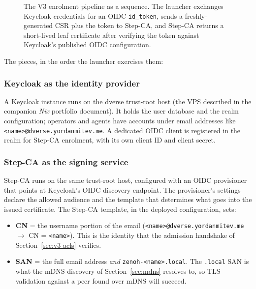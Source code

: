 \documentclass[11pt,a4paper]{article}
\begin{document}
\begin{figure}[H]
\caption{The V3 enrolment pipeline as a sequence. The launcher
exchanges Keycloak credentials for an OIDC \texttt{id\_token},
sends a freshly-generated CSR plus the token to Step-CA, and
Step-CA returns a short-lived leaf certificate after verifying the
token against Keycloak's published OIDC configuration.}
\label{fig:oidc-flow}
\end{figure}

The pieces, in the order the launcher exercises them:

\subsubsection{Keycloak as the identity provider}
A Keycloak instance runs on the dverse trust-root host (the VPS
described in the companion \emph{Nix} portfolio document). It holds
the user database and the realm configuration; operators and agents
have accounts under email addresses like
\texttt{<name>@dverse.yordanmitev.me}. A dedicated OIDC client is
registered in the realm for Step-CA enrolment, with its own client
ID and client secret.

\subsubsection{Step-CA as the signing service}
Step-CA runs on the same trust-root host, configured with an OIDC
provisioner that points at Keycloak's OIDC discovery endpoint. The
provisioner's settings declare the allowed audience and the
template that determines what goes into the issued certificate.
The Step-CA template, in the deployed configuration, sets:

\begin{itemize}[leftmargin=1.4em]
  \item \textbf{CN} = the username portion of the email
        (\texttt{<name>@dverse.yordanmitev.me} $\rightarrow$
        CN = \texttt{<name>}). This is the identity that the
        admission handshake of Section~\ref{sec:v3-acls} verifies.
  \item \textbf{SAN} = the full email address \emph{and}
        \texttt{zenoh-<name>.local}. The \texttt{.local} SAN is
        what the mDNS discovery of Section~\ref{sec:mdns} resolves to,
        so TLS validation against a peer found over mDNS will
        succeed.
\end{itemize}
\end{document}
